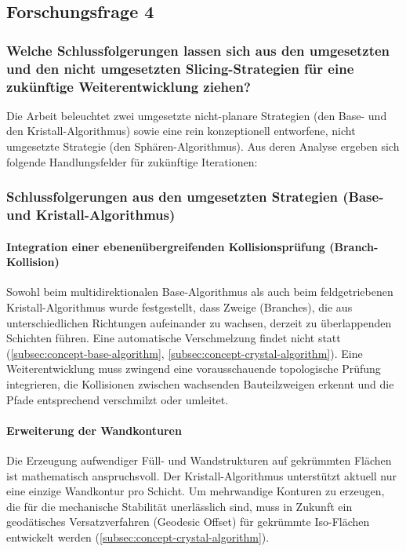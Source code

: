     \subsection{Forschungsfrage 4}
    \subsubsection{Welche Schlussfolgerungen lassen sich aus den umgesetzten und den nicht umgesetzten Slicing-Strategien für eine zukünftige Weiterentwicklung ziehen?}
      Die Arbeit beleuchtet zwei umgesetzte nicht-planare Strategien (den Base- und den Kristall-Algorithmus) sowie eine rein konzeptionell entworfene, nicht umgesetzte Strategie (den Sphären-Algorithmus).
      Aus deren Analyse ergeben sich folgende Handlungsfelder für zukünftige Iterationen:
      \subsubsection{Schlussfolgerungen aus den umgesetzten Strategien (Base- und Kristall-Algorithmus)}

      \paragraph{Integration einer ebenenübergreifenden Kollisionsprüfung (Branch-Kollision)}
        Sowohl beim multidirektionalen Base-Algorithmus als auch beim feldgetriebenen Kristall-Algorithmus wurde festgestellt, dass Zweige (Branches), die aus unterschiedlichen Richtungen aufeinander zu wachsen, derzeit zu überlappenden Schichten führen.
        Eine automatische Verschmelzung findet nicht statt (\ref{subsec:concept-base-algorithm}, \ref{subsec:concept-crystal-algorithm}).
        Eine Weiterentwicklung muss zwingend eine vorausschauende topologische Prüfung integrieren, die Kollisionen zwischen wachsenden Bauteilzweigen erkennt und die Pfade entsprechend verschmilzt oder umleitet.

      \paragraph{Erweiterung der Wandkonturen} 
        Die Erzeugung aufwendiger Füll- und Wandstrukturen auf gekrümmten Flächen ist mathematisch anspruchsvoll.
        Der Kristall-Algorithmus unterstützt aktuell nur eine einzige Wandkontur pro Schicht.
        Um mehrwandige Konturen zu erzeugen, die für die mechanische Stabilität unerlässlich sind, muss in Zukunft ein geodätisches Versatzverfahren (Geodesic Offset) für gekrümmte Iso-Flächen entwickelt werden (\ref{subsec:concept-crystal-algorithm}).

